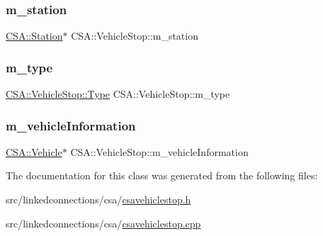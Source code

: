 \subsubsection{\texorpdfstring{m\+\_\+station}{m\_station}}
{\footnotesize\ttfamily \mbox{\hyperlink{classCSA_1_1Station}{C\+S\+A\+::\+Station}}$\ast$ C\+S\+A\+::\+Vehicle\+Stop\+::m\+\_\+station\hspace{0.3cm}{\ttfamily [private]}}

\mbox{\label{classCSA_1_1VehicleStop_a3a162e84b6ca51f7296d65f542e53f44}} 
\subsubsection{\texorpdfstring{m\+\_\+type}{m\_type}}
{\footnotesize\ttfamily \mbox{\hyperlink{classCSA_1_1VehicleStop_a7c2030d5a49808cb8e6fefaa691a76e0}{C\+S\+A\+::\+Vehicle\+Stop\+::\+Type}} C\+S\+A\+::\+Vehicle\+Stop\+::m\+\_\+type\hspace{0.3cm}{\ttfamily [private]}}

\mbox{\label{classCSA_1_1VehicleStop_adb8e903136887bad1106057bea070849}} 
\subsubsection{\texorpdfstring{m\+\_\+vehicle\+Information}{m\_vehicleInformation}}
{\footnotesize\ttfamily \mbox{\hyperlink{classCSA_1_1Vehicle}{C\+S\+A\+::\+Vehicle}}$\ast$ C\+S\+A\+::\+Vehicle\+Stop\+::m\+\_\+vehicle\+Information\hspace{0.3cm}{\ttfamily [private]}}



The documentation for this class was generated from the following files\+:\begin{DoxyCompactItemize}
\item 
src/linkedconnections/csa/\mbox{\hyperlink{csavehiclestop_8h}{csavehiclestop.\+h}}\item 
src/linkedconnections/csa/\mbox{\hyperlink{csavehiclestop_8cpp}{csavehiclestop.\+cpp}}\end{DoxyCompactItemize}

